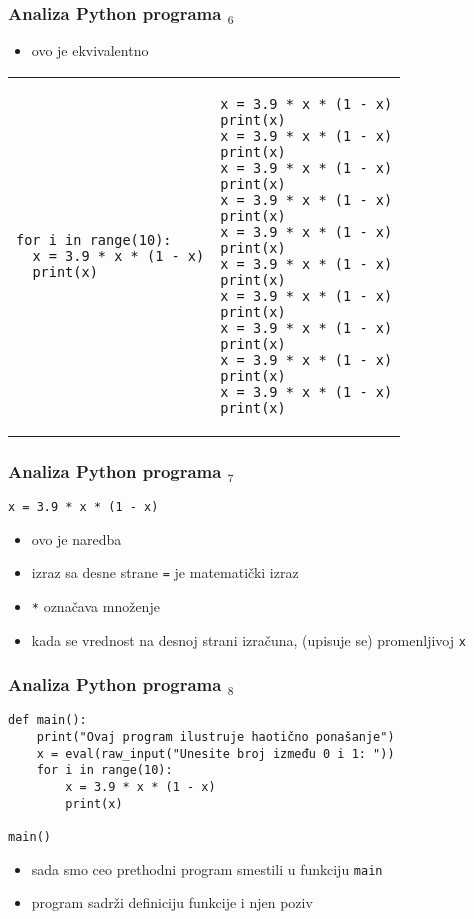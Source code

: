 \documentclass[utf8,compress]{beamer}
\begin{document}
\begin{frame}[fragile,shrink=30]
\frametitle{Analiza Python programa $_6$}
\begin{itemize}
  \item ovo je ekvivalentno
\end{itemize}
\begin{tabular}{|p{5cm}|p{5cm}|}
\begin{verbatim}
for i in range(10):
  x = 3.9 * x * (1 - x)
  print(x)
\end{verbatim}
&
\begin{verbatim}
x = 3.9 * x * (1 - x)
print(x)
x = 3.9 * x * (1 - x)
print(x)
x = 3.9 * x * (1 - x)
print(x)
x = 3.9 * x * (1 - x)
print(x)
x = 3.9 * x * (1 - x)
print(x)
x = 3.9 * x * (1 - x)
print(x)
x = 3.9 * x * (1 - x)
print(x)
x = 3.9 * x * (1 - x)
print(x)
x = 3.9 * x * (1 - x)
print(x)
x = 3.9 * x * (1 - x)
print(x)
\end{verbatim}
\end{tabular}
\end{frame}

\begin{frame}[fragile]
\frametitle{Analiza Python programa $_7$}
\begin{verbatim}
x = 3.9 * x * (1 - x)
\end{verbatim}
\begin{itemize}
  \item ovo je naredba 
  \item izraz sa desne strane \texttt{=} je matematički izraz
  \item \texttt{*} označava množenje
  \item kada se vrednost na desnoj strani izračuna,  (upisuje se) promenljivoj \texttt{x} 
\end{itemize}
\end{frame}

\begin{frame}[fragile]
\frametitle{Analiza Python programa $_8$}
\begin{verbatim}
def main():
    print("Ovaj program ilustruje haotično ponašanje")
    x = eval(raw_input("Unesite broj između 0 i 1: "))
    for i in range(10):
        x = 3.9 * x * (1 - x)
        print(x)

main()
\end{verbatim}
\begin{itemize}
  \item sada smo ceo prethodni program smestili u funkciju \texttt{main}
  \item program sadrži definiciju funkcije i njen poziv
\end{itemize}
\end{frame}
\end{document}
